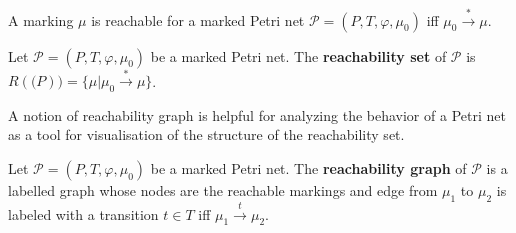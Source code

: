 \begin{definition}
  A marking $\mu$ is reachable for a marked Petri net $\mathcal P = (P,T,\varphi,\mu_0)$ iff $\mu_0\xrightarrow{*}\mu$.
\end{definition}

\begin{definition}
  Let $\mathcal P = (P,T,\varphi,\mu_0)$ be a marked Petri net. The {\bf reachability set} of $\mathcal P$ is $R(\mathcal(P)) = \{\mu|\mu_0\xrightarrow{*}\mu\}$.
\end{definition}

A notion of reachability graph is helpful for analyzing the behavior of a Petri net as a tool for visualisation of the structure of the reachability set.

\begin{definition}
  Let $\mathcal P = (P,T,\varphi,\mu_0)$ be a marked Petri net. The {\bf reachability graph} of $\mathcal P$ is a labelled graph whose nodes are the reachable markings and edge from $\mu_1$ to $\mu_2$ is labeled with a transition $t\in T$ iff $\mu_1\xrightarrow{t}\mu_2$.
\end{definition}

